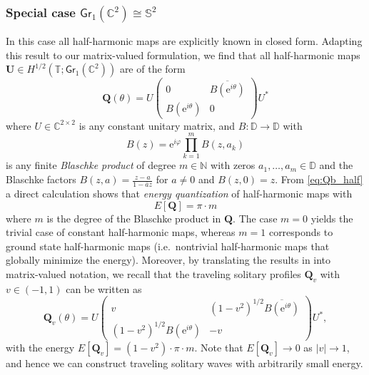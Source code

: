 \documentclass[10pt,reqno,a4paper]{amsart}
\theoremstyle{definition}
\theoremstyle{remark}
\theoremstyle{remark}
\numberwithin{equation}{section}
\newcommand{\C}{\mathbb{C}}
\newcommand{\N}{\mathbb{N}}
\newcommand{\T}{\mathbb{T}}
\newcommand{\D}{\mathbb{D}}
\newcommand{\Ss}{\mathbb{S}}
\newcommand{\ov}{\overline}
\newcommand{\be}{\begin{equation}}
\newcommand{\ee}{\end{equation}}
\newcommand{\eu}{\mathrm{e}}
\newcommand{\Ub}{\mathbf{U}}
\newcommand{\Gr}{\mathsf{Gr}}
\renewcommand{\phi}{\varphi}
\newcommand{\Qb}{\mathbf{Q}}
\begin{document}
\begin{appendix}
\subsubsection*{Special case $\Gr_1(\C^2) \cong \Ss^2$} In this case all half-harmonic maps are explicitly known in closed form.  Adapting this result to our matrix-valued formulation, we find that all half-harmonic maps $\Ub \in H^{1/2}(\T; \Gr_1(\C^2))$ are of the form
\be \label{eq:Qb_half}
\Qb(\theta) = U \left ( \begin{array}{cc} 0 & \ov{B(\eu^{i \theta})} \\ B(\eu^{i \theta}) & 0 \end{array} \right ) U^* 
\ee
where $U \in \C^{2 \times 2}$ is any constant unitary matrix, and $B: \D \to \D$ with
$$
B(z) = \eu^{i \phi} \prod_{k=1}^m B(z,a_k)
$$
is any finite {\em Blaschke product} of degree $m \in \N$ with zeros $a_1, \ldots, a_m \in \D$ and the Blaschke factors $B(z,a) =\frac{z-a}{1-\ov{a} z}$ for $a \neq 0$ and $B(z,0) = z$. From \eqref{eq:Qb_half} a direct calculation shows that {\em energy quantization} of half-harmonic maps with
$$
E[\Qb] = \pi \cdot m
$$
where $m$ is the degree of the Blaschke product in $\Qb$. The case $m=0$ yields the trivial case of constant half-harmonic maps, whereas $m=1$ corresponds to ground state half-harmonic maps (i.e.~nontrivial half-harmonic maps that globally minimize the energy). Moreover, by translating the results in \cite{LeSc-18} into matrix-valued notation, we recall that the traveling solitary profiles $\Qb_v$ with $v \in (-1,1)$ can be written as
\be
\Qb_v(\theta) = U \left ( \begin{array}{cc} v & (1-v^2)^{1/2} \ov{B(\eu^{i \theta})} \\ (1-v^2)^{1/2} B(\eu^{i \theta}) & -v \end{array} \right ) U^*,
\ee
with the energy $E[\Qb_v] = (1-v^2) \cdot \pi \cdot m$. Note that $E[\Qb_v] \to 0$ as $|v| \to 1$, and hence we can construct traveling solitary waves with arbitrarily small energy.


\end{appendix}
\end{document}
